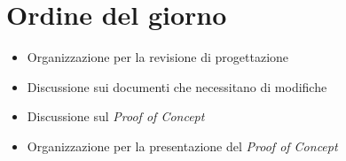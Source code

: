 \section{Ordine del giorno}
\begin{itemize}
\item Organizzazione per la revisione di progettazione
\item Discussione sui documenti che necessitano di modifiche
\item Discussione sul \textit{Proof of Concept}
\item Organizzazione per la presentazione del \textit{Proof of Concept}
\end{itemize}